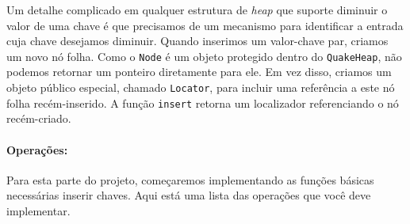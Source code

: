 \documentclass{article}
\begin{document}
Um detalhe complicado em qualquer estrutura de \textit{heap} que suporte diminuir o valor de uma chave é que precisamos de um mecanismo para identificar a entrada cuja chave desejamos diminuir. Quando inserimos um valor-chave
par, criamos um novo nó folha. Como o \texttt{Node} é um objeto protegido dentro do \texttt{QuakeHeap}, não podemos retornar um ponteiro diretamente para ele. Em vez disso, criamos um objeto público especial, chamado \texttt{Locator},
para incluir uma referência a este nó folha recém-inserido. A função \texttt{insert} retorna um localizador referenciando o nó recém-criado. 

\paragraph{Operações:} Para esta parte do projeto, começaremos implementando as funções básicas necessárias inserir chaves. Aqui está uma lista das operações que você deve implementar.
\end{document}
